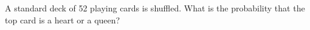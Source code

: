 \begin{problem}
A standard deck of 52 playing cards is shuffled. What is the probability that the top card is a heart or a queen?
\end{problem}





